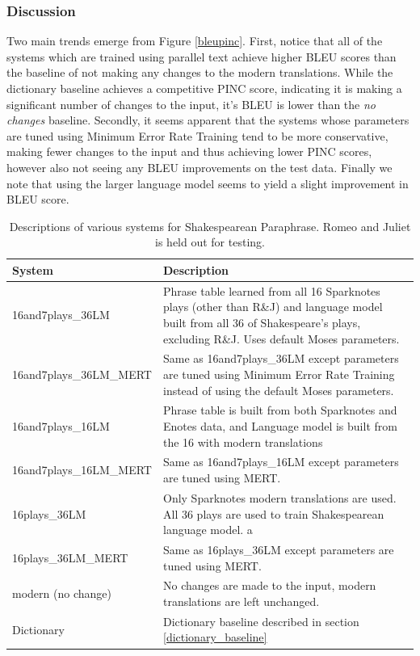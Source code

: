 \documentclass[10pt,a5paper,twoside]{article}
\begin{document}
\subsubsection{Discussion}
Two main trends emerge from Figure \ref{bleupinc}.  First, notice that all of the systems which are trained using parallel text achieve higher BLEU scores than the baseline
of not making any changes to the modern translations.  While the dictionary baseline achieves a competitive PINC score, indicating it is making a significant number of changes to the 
input, it's BLEU is lower than the \emph{no changes} baseline.  Secondly, it seems apparent that the systems whose parameters are tuned using Minimum Error Rate Training \cite{MERT}
tend to be more conservative, making fewer changes to the input and thus achieving lower PINC scores, however also not seeing any BLEU improvements on the test data.  Finally
we note that using the larger language model seems to yield a slight improvement in BLEU score.

\begin{table}
  \begin{center}
    \begin{tabular}{|l|p{3in}|}
      \hline
      System & Description \\
      \hline
      \hline
      16and7plays\_36LM & Phrase table learned from all 16 Sparknotes plays (other than R\&J) and language model built from all 36 of Shakespeare's plays, excluding R\&J.
      Uses default Moses parameters. \\
      \hline
      16and7plays\_36LM\_MERT & Same as 16and7plays\_36LM except parameters are tuned using Minimum Error Rate Training \cite{MERT} instead of using the default Moses parameters.\\
      \hline
      16and7plays\_16LM & Phrase table is built from both Sparknotes and Enotes data, and Language model is built from the 16 with modern translations\\
      \hline
      16and7plays\_16LM\_MERT & Same as 16and7plays\_16LM except parameters are tuned using MERT. \\
      \hline
      16plays\_36LM & Only Sparknotes modern translations are used.  All 36 plays are used to train Shakespearean language model. a\\
      \hline
      16plays\_36LM\_MERT & Same as 16plays\_36LM except parameters are tuned using MERT. \\
      \hline
      modern (no change) & No changes are made to the input, modern translations are left unchanged. \\
      \hline
      Dictionary & Dictionary baseline described in section \ref{dictionary_baseline}\\
      \hline
    \end{tabular}
  \end{center}
  \caption{Descriptions of various systems for Shakespearean Paraphrase.  Romeo and Juliet is held out for testing.}
  \label{systems}
\end{table}
\end{document}
